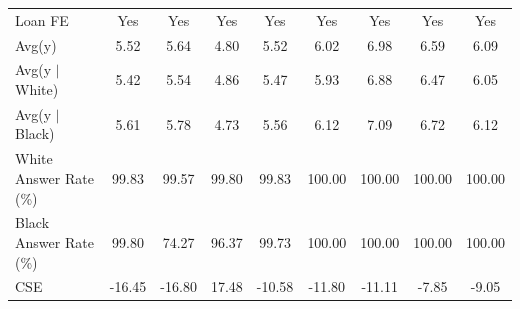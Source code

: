 {\begin{tabular}{l*{8}{c}}
Loan FE         &      Yes         &      Yes         &      Yes         &      Yes         &      Yes         &      Yes         &      Yes         &      Yes         \\
Avg(y)          &     5.52         &     5.64         &     4.80         &     5.52         &     6.02         &     6.98         &     6.59         &     6.09         \\
Avg(y $|$ White)&     5.42         &     5.54         &     4.86         &     5.47         &     5.93         &     6.88         &     6.47         &     6.05         \\
Avg(y $|$ Black)&     5.61         &     5.78         &     4.73         &     5.56         &     6.12         &     7.09         &     6.72         &     6.12         \\
White Answer Rate (\%)&    99.83         &    99.57         &    99.80         &    99.83         &   100.00         &   100.00         &   100.00         &   100.00         \\
Black Answer Rate (\%)&    99.80         &    74.27         &    96.37         &    99.73         &   100.00         &   100.00         &   100.00         &   100.00         \\
CSE             &   -16.45         &   -16.80         &    17.48         &   -10.58         &   -11.80         &   -11.11         &    -7.85         &    -9.05         \\
\bottomrule
\end{tabular}
}
